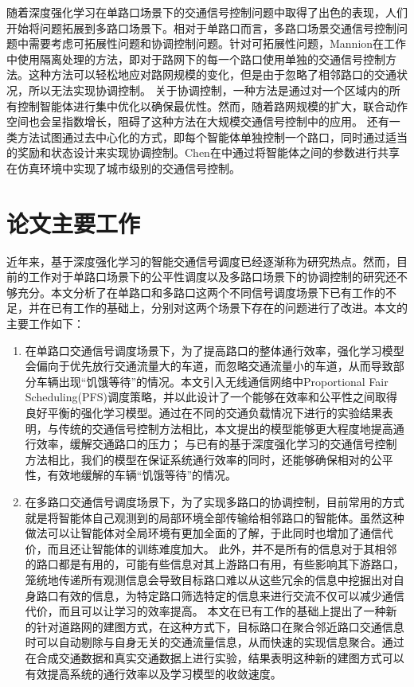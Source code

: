 随着深度强化学习在单路口场景下的交通信号控制问题中取得了出色的表现，人们开始将问题拓展到多路口场景下。相对于单路口而言，多路口场景交通信号控制问题中需要考虑可拓展性问题和协调控制问题。针对可拓展性问题，Mannion在工作中使用隔离处理的方法，即对于路网下的每一个路口使用单独的交通信号控制方法。这种方法可以轻松地应对路网规模的变化，但是由于忽略了相邻路口的交通状况，所以无法实现协调控制。
关于协调控制，一种方法是通过对一个区域内的所有控制智能体进行集中优化\cite{van2016coordinated}以确保最优性。然而，随着路网规模的扩大，联合动作空间也会呈指数增长，阻碍了这种方法在大规模交通信号控制中的应用。
还有一类方法试图通过去中心化的方式，即每个智能体单独控制一个路口，同时通过适当的奖励和状态设计来实现协调控制\cite{nishi2018traffic,wei2019colight}。Chen在中通过将智能体之间的参数进行共享在仿真环境中实现了城市级别的交通信号控制。


\section{论文主要工作}
近年来，基于深度强化学习的智能交通信号调度已经逐渐称为研究热点。然而，目前的工作对于单路口场景下的公平性调度以及多路口场景下的协调控制的研究还不够充分。本文分析了在单路口和多路口这两个不同信号调度场景下已有工作的不足，并在已有工作的基础上，分别对这两个场景下存在的问题进行了改进。本文的主要工作如下：
\begin{enumerate}
    \item 在单路口交通信号调度场景下，为了提高路口的整体通行效率，强化学习模型会偏向于优先放行交通流量大的车道，而忽略交通流量小的车道，从而导致部分车辆出现“饥饿等待”的情况。本文引入无线通信网络中Proportional Fair Scheduling(PFS)调度策略，并以此设计了一个能够在效率和公平性之间取得良好平衡的强化学习模型。通过在不同的交通负载情况下进行的实验结果表明，与传统的交通信号控制方法相比，本文提出的模型能够更大程度地提高通行效率，缓解交通路口的压力；
    与已有的基于深度强化学习的交通信号控制方法相比，我们的模型在保证系统通行效率的同时，还能够确保相对的公平性，有效地缓解的车辆“饥饿等待”的情况。
    \item 在多路口交通信号调度场景下，为了实现多路口的协调控制，目前常用的方式就是将智能体自己观测到的局部环境全部传输给相邻路口的智能体。虽然这种做法可以让智能体对全局环境有更加全面的了解，于此同时也增加了通信代价，而且还让智能体的训练难度加大。
    此外，并不是所有的信息对于其相邻的路口都是有用的，可能有些信息对其上游路口有用，有些影响其下游路口，笼统地传递所有观测信息会导致目标路口难以从这些冗余的信息中挖掘出对自身路口有效的信息，为特定路口筛选特定的信息来进行交流不仅可以减少通信代价，而且可以让学习的效率提高。
    本文在已有工作的基础上提出了一种新的针对道路网的建图方式，在这种方式下，目标路口在聚合邻近路口交通信息时可以自动剔除与自身无关的交通流量信息，从而快速的实现信息聚合。通过在合成交通数据和真实交通数据上进行实验，结果表明这种新的建图方式可以有效提高系统的通行效率以及学习模型的收敛速度。
\end{enumerate}
